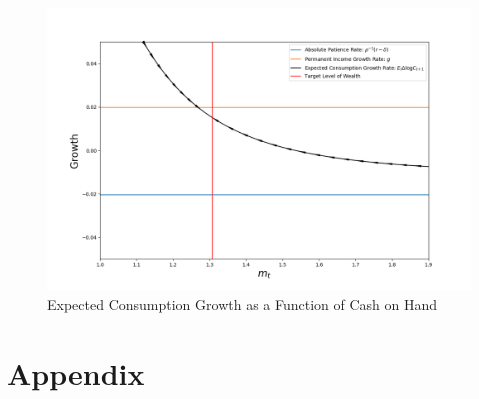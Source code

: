 \documentclass[]{article}
\providecommand{\RefDir}{References}
\begin{document}
\begin{center}
\begin{figure} 
\centerline{\includegraphics[width=6in]{Figures/Figure1a.png}}
\label{figure:1}
\caption{Expected Consumption Growth as a Function of Cash on Hand}
\end{figure}
\end{center}


\newpage

\section{Appendix}

%

\begin{table}[H]
	\label{table:1}
	\centerline{\scalebox{.5}{}}
\end{table}

\newpage

\nocite{*}


\end{document}
